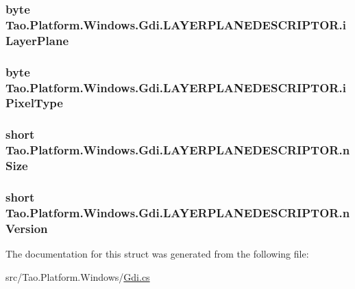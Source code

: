 \hypertarget{struct_tao_1_1_platform_1_1_windows_1_1_gdi_1_1_l_a_y_e_r_p_l_a_n_e_d_e_s_c_r_i_p_t_o_r_a7f6eae12197264196fb6977aa73a71ef}{
\subsubsection[{iLayerPlane}]{\setlength{\rightskip}{0pt plus 5cm}byte {\bf Tao.Platform.Windows.Gdi.LAYERPLANEDESCRIPTOR.iLayerPlane}}}
\label{struct_tao_1_1_platform_1_1_windows_1_1_gdi_1_1_l_a_y_e_r_p_l_a_n_e_d_e_s_c_r_i_p_t_o_r_a7f6eae12197264196fb6977aa73a71ef}
\hypertarget{struct_tao_1_1_platform_1_1_windows_1_1_gdi_1_1_l_a_y_e_r_p_l_a_n_e_d_e_s_c_r_i_p_t_o_r_a1c90c78fee62a2cc518426d4a7f39e88}{
\subsubsection[{iPixelType}]{\setlength{\rightskip}{0pt plus 5cm}byte {\bf Tao.Platform.Windows.Gdi.LAYERPLANEDESCRIPTOR.iPixelType}}}
\label{struct_tao_1_1_platform_1_1_windows_1_1_gdi_1_1_l_a_y_e_r_p_l_a_n_e_d_e_s_c_r_i_p_t_o_r_a1c90c78fee62a2cc518426d4a7f39e88}
\hypertarget{struct_tao_1_1_platform_1_1_windows_1_1_gdi_1_1_l_a_y_e_r_p_l_a_n_e_d_e_s_c_r_i_p_t_o_r_aed2e94c17ecced9efa925a5c7759a8b3}{
\subsubsection[{nSize}]{\setlength{\rightskip}{0pt plus 5cm}short {\bf Tao.Platform.Windows.Gdi.LAYERPLANEDESCRIPTOR.nSize}}}
\label{struct_tao_1_1_platform_1_1_windows_1_1_gdi_1_1_l_a_y_e_r_p_l_a_n_e_d_e_s_c_r_i_p_t_o_r_aed2e94c17ecced9efa925a5c7759a8b3}
\hypertarget{struct_tao_1_1_platform_1_1_windows_1_1_gdi_1_1_l_a_y_e_r_p_l_a_n_e_d_e_s_c_r_i_p_t_o_r_a3cb5978ae5981853e75a3a64aa4a9187}{
\subsubsection[{nVersion}]{\setlength{\rightskip}{0pt plus 5cm}short {\bf Tao.Platform.Windows.Gdi.LAYERPLANEDESCRIPTOR.nVersion}}}
\label{struct_tao_1_1_platform_1_1_windows_1_1_gdi_1_1_l_a_y_e_r_p_l_a_n_e_d_e_s_c_r_i_p_t_o_r_a3cb5978ae5981853e75a3a64aa4a9187}


The documentation for this struct was generated from the following file:\begin{DoxyCompactItemize}
\item 
src/Tao.Platform.Windows/\hyperlink{_gdi_8cs}{Gdi.cs}\end{DoxyCompactItemize}
